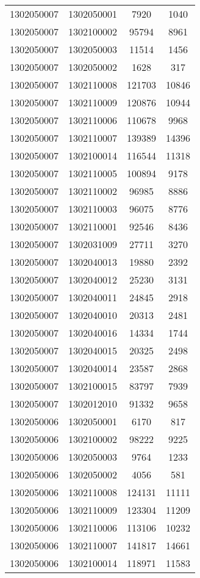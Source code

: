 \begin{longtable}{llcc}
1302050007 & 1302050001 & 7920 & 1040\\
1302050007 & 1302100002 & 95794 & 8961\\
1302050007 & 1302050003 & 11514 & 1456\\
1302050007 & 1302050002 & 1628 & 317\\
1302050007 & 1302110008 & 121703 & 10846\\
1302050007 & 1302110009 & 120876 & 10944\\
1302050007 & 1302110006 & 110678 & 9968\\
1302050007 & 1302110007 & 139389 & 14396\\
1302050007 & 1302100014 & 116544 & 11318\\
1302050007 & 1302110005 & 100894 & 9178\\
1302050007 & 1302110002 & 96985 & 8886\\
1302050007 & 1302110003 & 96075 & 8776\\
1302050007 & 1302110001 & 92546 & 8436\\
1302050007 & 1302031009 & 27711 & 3270\\
1302050007 & 1302040013 & 19880 & 2392\\
1302050007 & 1302040012 & 25230 & 3131\\
1302050007 & 1302040011 & 24845 & 2918\\
1302050007 & 1302040010 & 20313 & 2481\\
1302050007 & 1302040016 & 14334 & 1744\\
1302050007 & 1302040015 & 20325 & 2498\\
1302050007 & 1302040014 & 23587 & 2868\\
1302050007 & 1302100015 & 83797 & 7939\\
1302050007 & 1302012010 & 91332 & 9658\\
1302050006 & 1302050001 & 6170 & 817\\
1302050006 & 1302100002 & 98222 & 9225\\
1302050006 & 1302050003 & 9764 & 1233\\
1302050006 & 1302050002 & 4056 & 581\\
1302050006 & 1302110008 & 124131 & 11111\\
1302050006 & 1302110009 & 123304 & 11209\\
1302050006 & 1302110006 & 113106 & 10232\\
1302050006 & 1302110007 & 141817 & 14661\\
1302050006 & 1302100014 & 118971 & 11583\\

\end{longtable}
